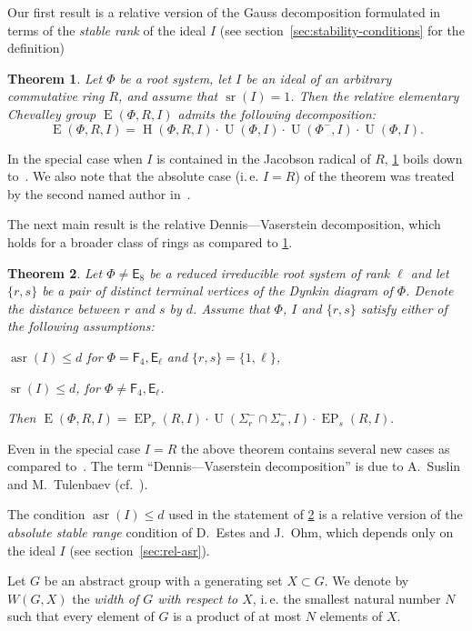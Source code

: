 \documentclass[oneside, 12pt]{amsart}
\theoremstyle{plain}
\newtheorem{thm}{Theorem}
\numberwithin{equation}{section}
\numberwithin{lemma}{section}
\theoremstyle{definition}
\theoremstyle{remark}
\DeclareMathOperator{\G}{G}
\DeclareMathOperator{\SL}{SL}
\DeclareMathOperator{\E}{E}
\DeclareMathOperator{\EP}{EP}
\DeclareMathOperator{\Hh}{H}
\DeclareMathOperator{\U}{U}
\DeclareMathOperator{\sr}{sr}
\DeclareMathOperator{\asr}{asr}
\newcommand{\rE}{\mathsf{E}}
\newcommand{\rF}{\mathsf{F}}
\begin{document}
Our first result is a relative version of the Gauss decomposition formulated in terms of the \emph{stable rank} of the ideal $I$ (see section~\ref{sec:stability-conditions} for the definition)
\begin{thm}\label{thm:srRI1}
Let $\Phi$ be a root system, let $I$ be an ideal of an arbitrary commutative ring $R$, and assume that $\sr(I)=1$.
Then the relative elementary Chevalley group $\E(\Phi, R, I)$ admits the following decomposition:
\[ \E(\Phi, R, I) = \Hh(\Phi, R, I) \cdot \U(\Phi, I) \cdot \U(\Phi^-, I) \cdot \U(\Phi, I). \]
\end{thm}
In the special case when $I$ is contained in the Jacobson radical of $R$, \cref{thm:srRI1} boils down to~\cite[Proposition~2.3]{Abe76}. 
We also note that the absolute case (i.\,e. $I=R$) of the theorem was treated by the second named author in~\cite{Sm12}.

The next main result is the relative Dennis---Vaserstein decomposition, which holds for a broader class of rings as compared to \cref{thm:srRI1}.
\begin{thm}\label{thm:DennisVaserstein}
Let $\Phi \neq \rE_8$ be a reduced irreducible root system of rank $\ell$ and let $\{ r, s \}$ be a pair of distinct terminal vertices of the Dynkin diagram of $\Phi$. Denote the distance between $r$ and $s$ by $d$.
Assume that $\Phi$, $I$ and $\{r, s\}$ satisfy either of the following assumptions:
\begin{thmlist}
 \item $\asr(I) \leqslant d$ for $\Phi=\rF_4, \rE_\ell$ and $\{r, s\} = \{1, \ell \}$, 
 \item $\sr(I) \leqslant d$, for $\Phi\neq\rF_4, \rE_\ell$.
\end{thmlist}
Then $\E(\Phi, R, I) = \EP_r(R, I) \cdot \U(\Sigma^-_r \cap \Sigma^-_s, I) \cdot \EP_s(R, I).$ \end{thm}
Even in the special case $I=R$ the above theorem contains several new cases as compared to~\cite[Theorems~2.5 and~4.1]{St78}.
The term ``Dennis---Vaserstein decomposition'' is due to A.~Suslin and M.~Tulenbaev (cf.~\cite[Lemma~2.1]{ST76}).

The condition $\asr(I) \leq d$ used in the statement of \cref{thm:DennisVaserstein} is a relative version of the \emph{absolute stable range} condition of D.~Estes and J.~Ohm, which depends only on the ideal $I$ (see section~\ref{sec:rel-asr}).

Let $G$ be an abstract group with a generating set $X \subset G$. 
We denote by $W(G, X)$ the \emph{width of $G$ with respect to $X$}, i.\,e. the smallest natural number $N$ such that every element of $G$ is a product of at most $N$ elements of $X$.
\end{document}
